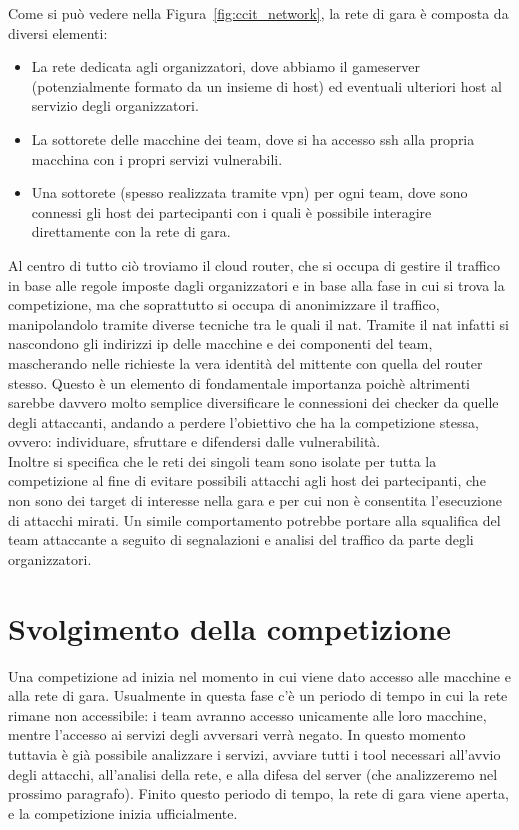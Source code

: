 Come si può vedere nella Figura~\ref{fig:ccit_network}, la rete di gara è composta da diversi elementi:
\begin{itemize}
    \setlength{\itemsep}{2pt}
    \setlength{\parskip}{2pt}
    \item La rete dedicata agli organizzatori, dove abbiamo il gameserver (potenzialmente formato da un insieme di host) ed eventuali ulteriori host al servizio degli organizzatori.
    \item La sottorete delle macchine dei team, dove si ha accesso ssh alla propria macchina con i propri servizi vulnerabili.
    \item Una sottorete (spesso realizzata tramite \gls{vpn}) per ogni team, dove sono connessi gli host dei partecipanti con i quali è possibile interagire direttamente con la rete di gara.
\end{itemize}

Al centro di tutto ciò troviamo il cloud router, che si occupa di gestire il traffico in base alle regole imposte dagli organizzatori e in base alla fase in cui si trova la competizione, ma che soprattutto si occupa di anonimizzare il traffico, manipolandolo tramite diverse tecniche tra le quali il \gls{nat}. Tramite il \gls{nat} infatti si nascondono gli indirizzi \gls{ip} delle macchine e dei componenti del team, mascherando nelle richieste la vera identità del mittente con quella del router stesso. Questo è un elemento di fondamentale importanza poichè altrimenti sarebbe davvero molto semplice diversificare le connessioni dei checker da quelle degli attaccanti, andando a perdere l'obiettivo che ha la competizione stessa, ovvero: individuare, sfruttare e difendersi dalle vulnerabilità.\\

Inoltre si specifica che le reti dei singoli team sono isolate per tutta la competizione al fine di evitare possibili attacchi agli host dei partecipanti, che non sono dei target di interesse nella gara e per cui non è consentita l'esecuzione di attacchi mirati.
Un simile comportamento potrebbe portare alla squalifica del team attaccante a seguito di segnalazioni e analisi del traffico da parte degli organizzatori.

\section{Svolgimento della competizione}

Una competizione \gls{ad} inizia nel momento in cui viene dato accesso alle macchine e alla rete di gara. Usualmente in questa fase c'è un periodo di tempo in cui la rete rimane non accessibile: i team avranno accesso unicamente alle loro macchine, mentre l'accesso ai servizi degli avversari verrà negato. In questo momento tuttavia è già possibile analizzare i servizi, avviare tutti i tool necessari all'avvio degli attacchi, all'analisi della rete, e alla difesa del server (che analizzeremo nel prossimo paragrafo). Finito questo periodo di tempo, la rete di gara viene aperta, e la competizione inizia ufficialmente.\\

